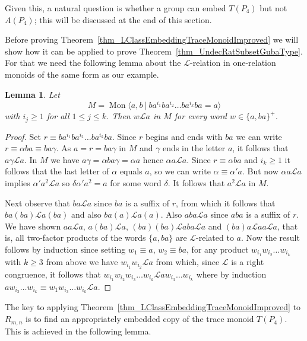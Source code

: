 \documentclass{amsart}
\newcommand{\Mpres}[2]{\operatorname{Mon}\bigl\langle #1\:|\:#2 \bigr\rangle}
\newcommand{\M}{R_{m,n}}
\newcommand{\gl}{\mathcal{L}}
\theoremstyle{plain}
\newtheorem{lemma}[theorem]{Lemma}
\theoremstyle{definition}
\begin{document}
Given this, a natural question is whether a group can embed $T(P_4)$ but not $A(P_4)$; this will be discussed at the end of this section.   

Before proving Theorem~\ref{thm_LClassEmbeddingTraceMonoidImproved} we will show how it can be applied to prove Theorem~\ref{thm_UndecRatSubsetGubaType}. For that we need the following lemma about the $\gl$-relation in one-relation monoids of the same form as our example.   

\begin{lemma}\label{lem_LClassofa} 
Let  
\[
M = \Mpres{a,b}{ba^{i_1}ba^{i_2} \ldots ba^{i_k} b a =a}
\] 
with $i_j \geq 1$ for all $1 \leq j \leq k
$. 
Then $w \gl a$ in $M$ for every word $w \in \{a,ba\}^+$. 
  \end{lemma}
\begin{proof} 
Set $r \equiv ba^{i_1}ba^{i_2} \ldots ba^{i_k} b a$. Since $r$ begins and ends with $ba$ we can write $r \equiv \alpha ba \equiv ba \gamma$.  As $a=r=ba\gamma$ in $M$ and $\gamma$ ends in the letter $a$, it follows that $a \gamma \gl a$. In $M$ we have $ a \gamma = \alpha ba \gamma = \alpha a $ hence $\alpha a \gl a$.  Since $r \equiv \alpha ba$ and $i_k \geq 1$ it follows that  the last letter of $\alpha$ equals $a$, so we can write $\alpha \equiv \alpha' a$. But now $\alpha a \gl a$ implies $\alpha' a^2 \gl a$ so $\delta \alpha' a^2 = a$ for some word $\delta$. It follows that $a^2 \gl a$ in $M$.              

Next observe that $ba \gl a$ since $ba$ is a suffix of $r$, from which it follows that $ba(ba) \gl a(ba)$ and also $ba(a) \gl a(a)$.  Also $aba \gl a$ since $aba$ is a suffix of $r$.   We have shown $aa \gl a$, $a(ba) \gl a$, $(ba)(ba) \gl aba \gl a$ and $(ba)a \gl aa \gl a$, that is, all two-factor products of the words $\{a,ba\}$ are $\gl$-related to $a$.   Now the result follows by induction since setting $w_1 \equiv a$, $w_2 \equiv ba$, for any product  $ w_{i_1} w_{i_2} \ldots w_{i_k} $ with $k \geq 3$  from above we have $w_{i_1} w_{i_2} \gl a$ 
from which, since $\gl$ is a right congruence, it follows that   
$
w_{i_1} w_{i_2} w_{i_3} \ldots w_{i_k} \gl a w_{i_3} \ldots w_{i_k}
$
where by induction $a w_{i_3} \ldots w_{i_k} \equiv w_1 w_{i_3} \ldots w_{i_k} \gl a$. 
\end{proof}

The key to applying Theorem~\ref{thm_LClassEmbeddingTraceMonoidImproved} to $\M$ is to find an appropriately embedded copy of the trace monoid $T(P_4)$. This is achieved in the following lemma.  
\end{document}
